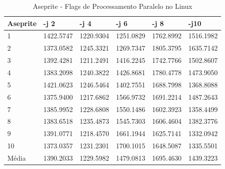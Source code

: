 \begin{table}[!ht]
\centering
\caption{Aseprite - Flags de Processamento Paralelo no Linux}
\label{tab:flag_processamento_paralelo:linux:aseprite}
\begin{tabular}{llllll}
\textbf{Aseprite} & \textbf{-j 2} & \textbf{-j 4} & \textbf{-j 6} & \textbf{-j 8} & \textbf{-j10}  \\ \toprule
1                 &  1422.5747    &     1220.9304 &     1251.0829 &     1762.8992 &  1516.1982    \\ 
2                 &  1373.0582    &     1245.3321 &     1269.7347 &     1805.3795 &  1635.7142    \\ 
3                 &  1392.4281    &     1211.2491 &     1416.2245 &     1742.7766 &  1502.8607    \\ 
4                 &  1383.2098    &     1240.3822 &     1426.8681 &     1780.4778 &  1473.9050    \\ 
5                 &  1421.0623    &     1246.5464 &     1402.7551 &     1688.7998 &  1368.8088    \\ 
6                 &  1375.9400    &     1217.6862 &     1566.9732 &     1691.2214 &  1487.2643    \\ 
7                 &  1385.9952    &     1228.6808 &     1550.1486 &     1602.3923 &  1358.4499    \\ 
8                 &  1383.6518    &     1235.4873 &     1545.7303 &     1606.4604 &  1382.3776    \\ 
9                 &  1391.0771    &     1218.4570 &     1661.1944 &     1625.7141 &  1332.0942    \\ 
10                &  1373.0357    &     1231.2301 &     1700.1015 &     1648.5087 &  1335.5501    \\ \bottomrule
Média             &  1390.2033    &     1229.5982 &     1479.0813 &     1695.4630 &  1439.3223    \\ 
\end{tabular}
\end{table}

